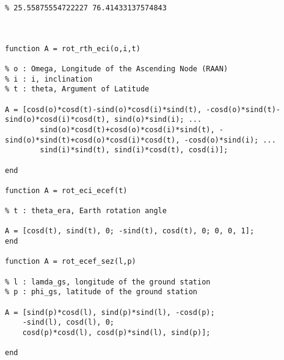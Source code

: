 \begin{lstlisting}[frame=lines,style=Matlab-editor,basicstyle = \mlttfamily]
% GMAT LAT LONG
% 25.55875554722227 76.41433137574843



function A = rot_rth_eci(o,i,t)

% o : Omega, Longitude of the Ascending Node (RAAN)
% i : i, inclination
% t : theta, Argument of Latitude

A = [cosd(o)*cosd(t)-sind(o)*cosd(i)*sind(t), -cosd(o)*sind(t)-sind(o)*cosd(i)*cosd(t), sind(o)*sind(i); ...
        sind(o)*cosd(t)+cosd(o)*cosd(i)*sind(t), -sind(o)*sind(t)+cosd(o)*cosd(i)*cosd(t), -cosd(o)*sind(i); ...
        sind(i)*sind(t), sind(i)*cosd(t), cosd(i)];

end

function A = rot_eci_ecef(t)

% t : theta_era, Earth rotation angle

A = [cosd(t), sind(t), 0; -sind(t), cosd(t), 0; 0, 0, 1];
end

function A = rot_ecef_sez(l,p)

% l : lamda_gs, longitude of the ground station
% p : phi_gs, latitude of the ground station

A = [sind(p)*cosd(l), sind(p)*sind(l), -cosd(p);
    -sind(l), cosd(l), 0;
    cosd(p)*cosd(l), cosd(p)*sind(l), sind(p)];

end

\end{lstlisting}
